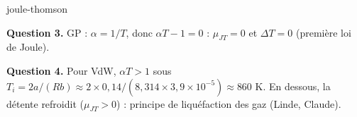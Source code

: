 \begin{exo}{joule-thomson}
\begin{solution}
\textbf{Question 3.} GP : $\alpha = 1/T$, donc $\alpha T - 1 = 0$ : $\mu_{JT} = 0$ et $\Delta T = 0$ (première loi de Joule).

\textbf{Question 4.} Pour VdW, $\alpha T > 1$ sous $T_i = 2a/(Rb) \approx 2\times0{,}14/(8{,}314\times3{,}9\times10^{-5}) \approx 860$ K. En dessous, la détente refroidit ($\mu_{JT} > 0$) : principe de liquéfaction des gaz (Linde, Claude).
\end{solution}
\end{exo}
